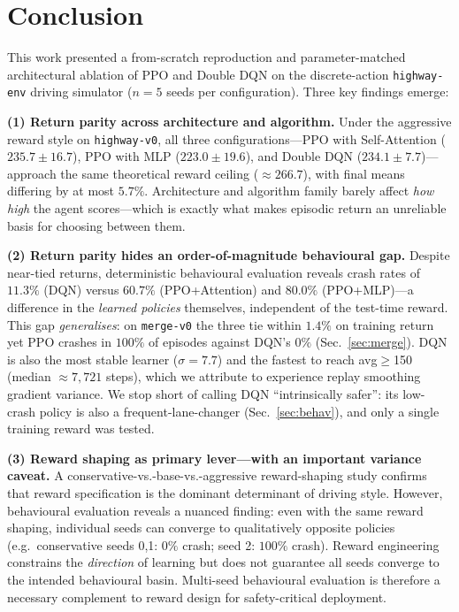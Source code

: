 \documentclass[conference]{IEEEtran}
\newcommand{\code}[1]{\texttt{#1}}
\begin{document}
\section{Conclusion}
This work presented a from-scratch reproduction and parameter-matched architectural
ablation of PPO and Double DQN on the discrete-action \code{highway-env} driving
simulator ($n=5$ seeds per configuration). Three key findings emerge:

\textbf{(1) Return parity across architecture and algorithm.} Under the
aggressive reward style on \code{highway-v0}, all three configurations---PPO
with Self-Attention ($235.7 \pm 16.7$), PPO with MLP ($223.0 \pm 19.6$), and
Double DQN ($234.1 \pm 7.7$)---approach the same theoretical reward ceiling
(${\approx}266.7$), with final means differing by at most $5.7\%$. Architecture
and algorithm family barely affect \emph{how high} the agent scores---which is
exactly what makes episodic return an unreliable basis for choosing between them.

\textbf{(2) Return parity hides an order-of-magnitude behavioural gap.} Despite
near-tied returns, deterministic behavioural evaluation reveals crash rates of
$11.3\%$ (DQN) versus $60.7\%$ (PPO+Attention) and $80.0\%$ (PPO+MLP)---a
difference in the \emph{learned policies} themselves, independent of the
test-time reward. This gap \emph{generalises}: on \code{merge-v0} the three tie
within $1.4\%$ on training return yet PPO crashes in $100\%$ of episodes against
DQN's $0\%$ (Sec.~\ref{sec:merge}). DQN is also the most stable learner
($\sigma=7.7$) and the fastest to reach avg$\geq$150 (median ${\approx}7{,}721$
steps), which we attribute to experience replay smoothing gradient variance. We
stop short of calling DQN ``intrinsically safer'': its low-crash policy is also a
frequent-lane-changer (Sec.~\ref{sec:behav}), and only a single training reward
was tested.

\textbf{(3) Reward shaping as primary lever---with an important variance caveat.}
A conservative-vs.-base-vs.-aggressive reward-shaping study confirms that
reward specification is the dominant determinant of driving style. However,
behavioural evaluation reveals a nuanced finding: even with the same reward
shaping, individual seeds can converge to qualitatively opposite policies (e.g.\
conservative seeds 0,1: $0\%$ crash; seed 2: $100\%$ crash). Reward engineering
constrains the \emph{direction} of learning but does not guarantee all seeds
converge to the intended behavioural basin. Multi-seed behavioural evaluation
is therefore a necessary complement to reward design for safety-critical
deployment.
\end{document}
